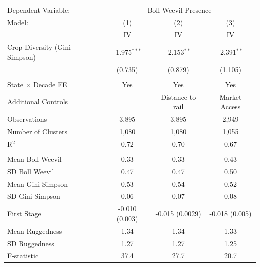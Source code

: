 

\begingroup
\centering
\begin{tabular}{lccc}
   \toprule \toprule
   Dependent Variable: & \multicolumn{3}{c}{Boll Weevil Presence} \\
   Model: & (1) & (2) & (3) \\
   & IV & IV & IV \\
   \midrule
  Crop Diversity (Gini-Simpson) & -1.975$^{***}$ & -2.153$^{**}$ & -2.391$^{**}$ \\
  & (0.735) & (0.879) & (1.105) \\
   & & & \\
   State $\times$ Decade FE        & Yes & Yes & Yes \\
   Additional Controls           &     & Distance to rail & Market Access \\
   \midrule
  Observations & 3,895 & 3,895 & 2,949 \\
  Number of Clusters & 1,080 & 1,080 & 1,055 \\
  R$^2$ & 0.72 & 0.70 & 0.67 \\
   & & & \\

  Mean Boll Weevil & 0.33 & 0.33 & 0.43 \\
  SD Boll Weevil & 0.47 & 0.47 & 0.50 \\
  Mean Gini-Simpson & 0.53 & 0.54 & 0.52 \\
  SD Gini-Simpson & 0.06 & 0.07 & 0.08 \\
   \midrule
  First Stage & -0.010 (0.003) & -0.015 (0.0029) & -0.018 (0.005) \\
  Mean Ruggedness & 1.34 & 1.34 & 1.33 \\
  SD Ruggedness & 1.27 & 1.27 & 1.25 \\
  F-statistic & 37.4 & 27.7 & 20.7 \\

   \bottomrule \bottomrule
\end{tabular}
\par\endgroup
